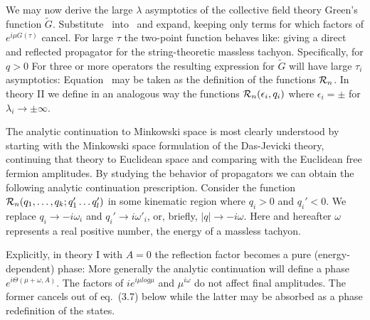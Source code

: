 We may now derive the large $\lambda$ asymptotics of the collective
field theory Green's function $\tilde G$. 
Substitute \asympi\ into \nptev\ and expand,
keeping only terms for which factors of $e^{i\mu G(\tau)}$ cancel.
For
large $\tau$ the two-point function behaves like:
\eqn{}
giving a direct and reflected propagator for the string-theoretic 
massless tachyon.
Specifically, for $q > 0$
\eqn{}
For three or more operators the resulting expression for $\tilde G$
will have large $\tau_i$ asymptotics:
\eqn{}
Equation \ may be taken as the definition of the 
functions ${\cal R}_n$. 
In theory II we define in an analogous way
the functions ${\cal R}_n(\epsilon_i,q_i)$
where $\epsilon_i=\pm$ for $\lambda_i\to \pm \infty$.
 
 
The analytic continuation to Minkowski space is most clearly
understood by starting with the Minkowski space formulation
of the Das-Jevicki theory, continuing that theory to Euclidean
space and comparing with the Euclidean free fermion amplitudes.
By studying the behavior of propagators we can obtain the
following analytic continuation prescription. Consider
the function ${\cal R}_n(q_1,\dots, q_k;q_1'\dots q_l')$ 
in some kinematic region where
$q_i>0$ and $q_i'<0$. We replace $q_i\to -i \omega_i$
and $q_i'\to i\omega'_i$, or, briefly, $|q|\to -i\omega$.
Here and hereafter $\omega$ represents a real positive 
number, the energy of a massless tachyon. 
 
Explicitly, in theory I with $A=0$ the reflection factor
becomes a pure (energy-dependent) phase:
\eqn{}
More generally the analytic continuation will define a phase
$e^{i\Theta(\mu+\omega,A)}$.
The factors of $i e^{i\mu log\mu}$ and $\mu^{i\omega}$ do not affect final 
amplitudes. The former cancels out of eq.~(3.7) below while the
latter may be absorbed as a phase redefinition of the states. 
 
